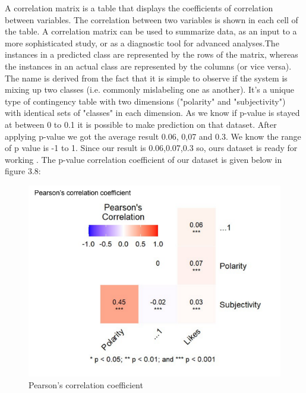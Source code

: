 A correlation matrix is a table that displays the coefficients of correlation between variables. The correlation between two variables is shown in each cell of the table. A correlation matrix can be used to summarize data, as an input to a more sophisticated study, or as a diagnostic tool for advanced analyses.The instances in a predicted class are represented by the rows of the matrix, whereas the instances in an actual class are represented by the columns (or vice versa). The name is derived from the fact that it is simple to observe if the system is mixing up two classes (i.e. commonly mislabeling one as another). It's a unique type of contingency table with two dimensions ("polarity" and "subjectivity") with identical sets of "classes" in each dimension. As we know if p-value is stayed at between 0 to 0.1 it is possible to make prediction on that dataset. After applying p-value we got the average result 0.06, 0,07 and 0.3. We know the range of p value is -1 to 1. Since our result is 0.06,0.07,0.3 so, ours dataset is ready for working . The p-value correlation coefficient of our dataset is given below in figure 3.8: \\

\begin{figure}[H]
    \centering
    \includegraphics[scale=.9]{img3/Pearson.png}
    \caption{Pearson’s correlation coefficient}
    \label{fig:Pearson’s correlation coefficient}
\end{figure}

